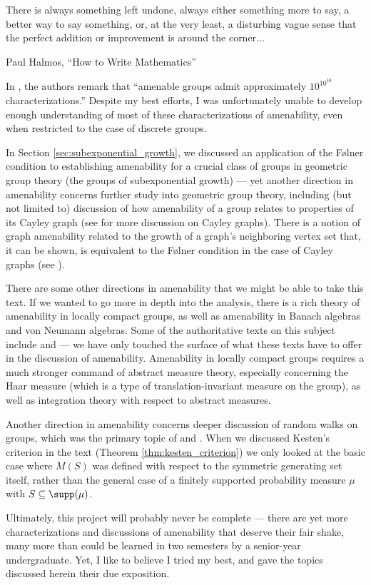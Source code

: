 \epigraph{There is always something left undone, always either something more to say, a better way to say something, or, at the very least, a disturbing vague sense that the perfect addition or improvement is around the corner...}{Paul Halmos, ``How to Write Mathematics''}
In \cite[48]{brown_and_ozawa}, the authors remark that ``amenable groups admit approximately $10^{10^{10}}$ characterizations.'' Despite my best efforts, I was unfortunately unable to develop enough understanding of most of these characterizations of amenability, even when restricted to the case of discrete groups.\newline

In Section \ref{sec:subexponential_growth}, we discussed an application of the Følner condition to establishing amenability for a crucial class of groups in geometric group theory (the groups of subexponential growth) --- yet another direction in amenability concerns further study into geometric group theory, including (but not limited to) discussion of how amenability of a group relates to properties of its Cayley graph (see \cite[Section 3.2]{loh_geometric_group_theory} for more discussion on Cayley graphs). There is a notion of graph amenability related to the growth of a graph's neighboring vertex set that, it can be shown, is equivalent to the Følner condition in the case of Cayley graphs (see \cite{monfared_cayley_graphs}).\newline

There are some other directions in amenability that we might be able to take this text. If we wanted to go more in depth into the analysis, there is a rich theory of amenability in locally compact groups, as well as amenability in Banach algebras and von Neumann algebras. Some of the authoritative texts on this subject include \cite{kazhdan_property_t} and \cite{amenable_banach_algebras} --- we have only touched the surface of what these texts have to offer in the discussion of amenability. Amenability in locally compact groups requires a much stronger command of abstract measure theory, especially concerning the Haar measure (which is a type of translation-invariant measure on the group), as well as integration theory with respect to abstract measures.\newline

Another direction in amenability concerns deeper discussion of random walks on groups, which was the primary topic of \cite{kesten_means} and \cite{kesten_random_walks}. When we discussed Kesten's criterion in the text (Theorem \ref{thm:kesten_criterion}) we only looked at the basic case where $M(S)$ was defined with respect to the symmetric generating set itself, rather than the general case of a finitely supported probability measure $\mu$ with $S\subseteq \supp(\mu)$.\newline

Ultimately, this project will probably never be complete --- there are yet more characterizations and discussions of amenability that deserve their fair shake, many more than could be learned in two semesters by a senior-year undergraduate. Yet, I like to believe I tried my best, and gave the topics discussed herein their due exposition.
